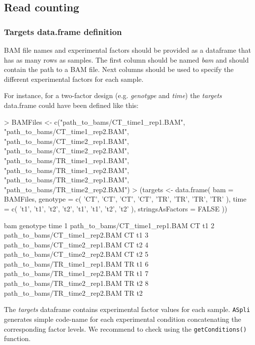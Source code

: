 \documentclass{article}
\begin{document}
\subsection{Read counting}\label{sec:rcounts}

\subsubsection{Targets data.frame definition}\label{sec:targetsDef}

BAM file names and experimental factors should be provided as a dataframe 
that has as many rows as samples. The first column  should be named \textit{bam} and should contain the path to a BAM file. Next columns should be used to specify the different experimental factors for each sample.

For instance, for a two-factor design (e.g. {\em genotype} and {\em time}) the {\em targets} 
data.frame could have been defined like this:

\begin{Schunk}
\begin{Sinput}
> BAMFiles <- c("path_to_bams/CT_time1_rep1.BAM", "path_to_bams/CT_time1_rep2.BAM",
               "path_to_bams/CT_time2_rep1.BAM", "path_to_bams/CT_time2_rep2.BAM",
               "path_to_bams/TR_time1_rep1.BAM", "path_to_bams/TR_time1_rep2.BAM",
               "path_to_bams/TR_time2_rep1.BAM", "path_to_bams/TR_time2_rep2.BAM")
> (targets <- data.frame( bam = BAMFiles,
                         genotype = c( 'CT', 'CT', 'CT',  'CT', 
                                       'TR', 'TR', 'TR', 'TR' ),
                         time     = c( 't1', 't1', 't2', 't2', 
                                       't1', 't1', 't2', 't2' ),
                          stringsAsFactors = FALSE ))
\end{Sinput}
\begin{Soutput}
                             bam genotype time
1 path_to_bams/CT_time1_rep1.BAM       CT   t1
2 path_to_bams/CT_time1_rep2.BAM       CT   t1
3 path_to_bams/CT_time2_rep1.BAM       CT   t2
4 path_to_bams/CT_time2_rep2.BAM       CT   t2
5 path_to_bams/TR_time1_rep1.BAM       TR   t1
6 path_to_bams/TR_time1_rep2.BAM       TR   t1
7 path_to_bams/TR_time2_rep1.BAM       TR   t2
8 path_to_bams/TR_time2_rep2.BAM       TR   t2
\end{Soutput}
\end{Schunk}


The {\em targets} dataframe contains experimental factor values for each sample. \texttt{ASpli} generates simple code-name for each experimental condition concatenating the corresponding factor levels. We recommend to check using the \texttt{getConditions()} function. 
\end{document}
